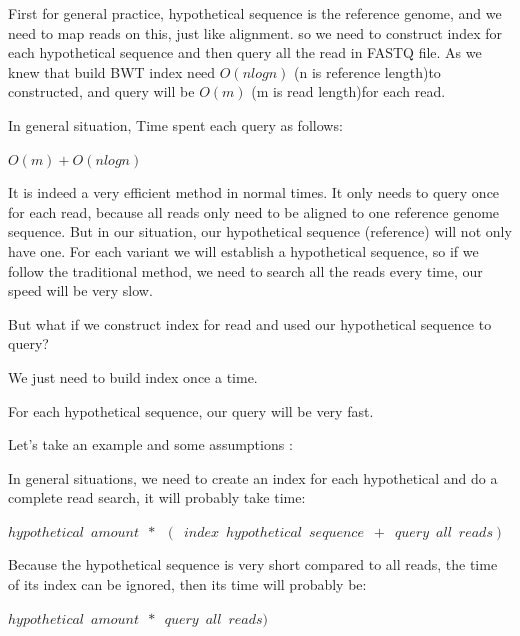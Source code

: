 First for general practice, hypothetical sequence is the reference genome, and we need to map reads on this, just like alignment. so we need to construct index for each hypothetical sequence and then query all the read in FASTQ file. As we knew that build BWT index need $O(nlogn)$  (n is reference length)to constructed, and query will be $O(m)$ (m is read length)for each read.
\begin{flushleft}
In general situation, Time spent each query as follows: 
\end{flushleft} 
\begin{center}
    $O(m)+O(nlogn)$
\end{center}  

It is indeed a very efficient method in normal times. It only needs to query once for each read, because all reads only need to be aligned to one reference genome sequence. But in our situation, our hypothetical sequence (reference) will not only have one. For each variant we will establish a hypothetical sequence, so if we follow the traditional method, we need to search all the reads every time, our speed will be very slow.

But what if we construct index for read and used our hypothetical sequence to query?
\begin{enumerate}
{
    \item We just need to build index once a time.
    \item For each hypothetical sequence, our query will be very fast.
}
\end{enumerate}

\begin{flushleft}
Let’s take an example and some assumptions :
\end{flushleft}

In general situations, we need to create an index for each hypothetical and do a complete read search, it will probably take time:
\begin{center}
    $hypothetical\enspace amount\enspace*\enspace(\enspace index\enspace hypothetical\enspace sequence\enspace+\enspace query\enspace all\enspace reads)$
\end{center}  
\begin{flushleft}
Because the hypothetical sequence is very short compared to all reads, the time of its index can be ignored, then its time will probably be:
\end{flushleft}
\begin{center}
    $hypothetical\enspace amount\enspace*\enspace query\enspace all\enspace reads)$
\end{center}  

